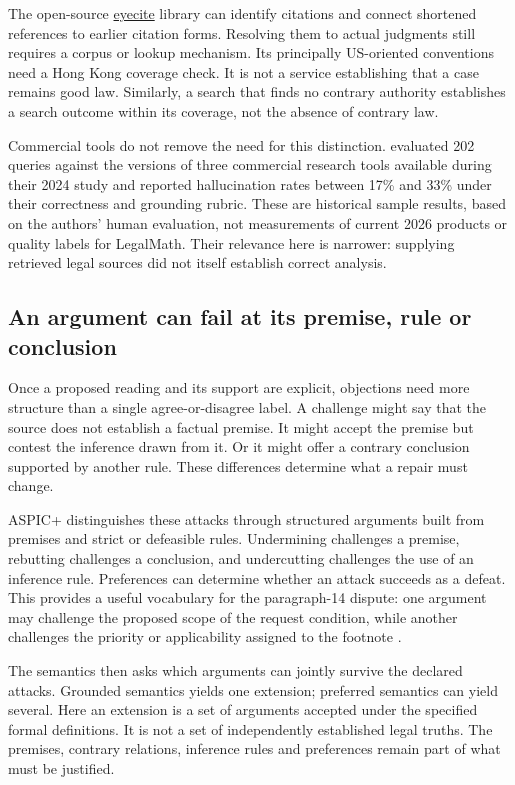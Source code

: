The open-source \href{https://github.com/freelawproject/eyecite}{eyecite}
library can identify citations and connect shortened references to earlier
citation forms. Resolving them to actual judgments still requires a corpus
or lookup mechanism. Its principally US-oriented conventions need a
Hong Kong coverage check. It is not a service establishing that a case
remains good law. Similarly, a search that finds no contrary authority
establishes a search outcome within its coverage, not the absence of contrary
law.

Commercial tools do not remove the need for this distinction.
\citet[secs.~5--6]{legalrag2024} evaluated 202 queries against the versions of
three commercial research tools available during their 2024 study and
reported hallucination rates between 17\% and 33\% under their correctness
and grounding rubric. These are historical sample results, based on the
authors' human evaluation, not measurements of current 2026 products or
quality labels for LegalMath. Their relevance here is narrower: supplying
retrieved legal sources did not itself establish correct analysis.

\subsection{An argument can fail at its premise, rule or conclusion}

Once a proposed reading and its support are explicit, objections need more
structure than a single agree-or-disagree label. A challenge might say that
the source does not establish a factual premise. It might accept the premise
but contest the inference drawn from it. Or it might offer a contrary
conclusion supported by another rule. These differences determine what a
repair must change.

ASPIC+ distinguishes these attacks through structured arguments built from
premises and strict or defeasible rules. Undermining challenges a premise,
rebutting challenges a conclusion, and undercutting challenges the use of an
inference rule. Preferences can determine whether an attack succeeds as a
defeat. This provides a useful vocabulary for the paragraph-14 dispute:
one argument may challenge the proposed scope of the request condition,
while another challenges the priority or applicability assigned to the
footnote \citep[secs.~2--3]{aspic2010}.

The semantics then asks which arguments can jointly survive the declared
attacks. Grounded semantics yields one extension; preferred semantics can
yield several. Here an extension is a set of arguments accepted under the
specified formal definitions. It is not a set of independently established
legal truths. The premises, contrary relations, inference rules and
preferences remain part of what must be justified.

